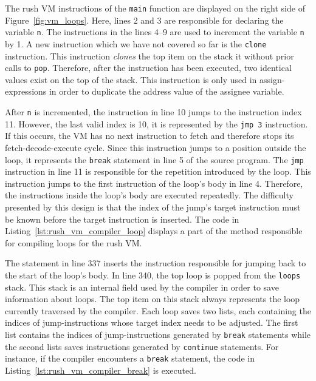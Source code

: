 The rush VM instructions of the \texttt{main} function are displayed on the right side of Figure~\ref{fig:vm_loops}.
Here, lines 2 and 3 are responsible for declaring the variable \texttt{n}.
The instructions in the lines 4--9 are used to increment the variable \texttt{n} by 1.
A new instruction which we have not covered so far is the \texttt{clone} instruction.
This instruction \emph{clones} the top item on the stack it without prior calls to \texttt{pop}.
Therefore, after the instruction has been executed, two identical values exist on the top of the stack.
This instruction is only used in assign-expressions in order to duplicate the address value of the assignee variable.

After \texttt{n} is incremented, the instruction in line 10 jumps to the instruction index 11.
However, the last valid index is 10, it is represented by the \texttt{jmp 3} instruction.
If this occurs, the VM has no next instruction to fetch and therefore stops its fetch-decode-execute cycle.
Since this instruction jumps to a position outside the loop, it represents the \texttt{break} statement in line 5 of the source program.
The \texttt{jmp} instruction in line 11 is responsible for the repetition introduced by the loop.
This instruction jumps to the first instruction of the loop's body in line 4.
Therefore, the instructions inside the loop's body are executed repeatedly.
The difficulty presented by this design is that the index of the jump's target instruction must be known before the target instruction is inserted.
The code in Listing~\ref{lst:rush_vm_compiler_loop} displays a part of the method responsible for compiling loops for the rush VM.


The statement in line 337 inserts the instruction responsible for jumping back to the start of the loop's body.
In line 340, the top loop is popped from the \texttt{loops} stack.
This stack is an internal field used by the compiler in order to save information about loops.
The top item on this stack always represents the loop currently traversed by the compiler.
Each loop saves two lists, each containing the indices of jump-instructions whose target index needs to be adjusted.
The first list contains the indices of jump-instructions generated by \texttt{break} statements
while the second lists saves instructions generated by \texttt{continue} statements.
For instance, if the compiler encounters a \texttt{break} statement, the code in Listing~\ref{lst:rush_vm_compiler_break} is executed.

